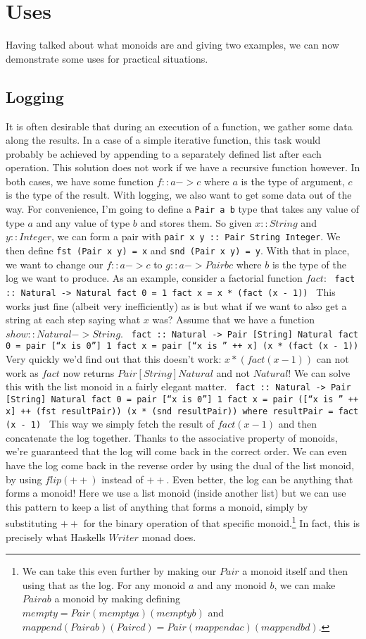 \documentclass{acm_proc_article-sp}
\begin{document}
\section{Uses}
Having talked about what monoids are and giving two examples, we can now
demonstrate some uses for practical situations.

\subsection{Logging}
It is often desirable that during an execution of a function, we
gather some data along the results. In a case of a simple iterative
function, this task would probably be achieved by appending to a
separately defined list after each operation. This solution does not
work if we have a recursive function however.
In both cases, we have some function $f :: a -> c$ where $a$ is
the type of argument, $c$ is the type of the result. With logging, we
also want to get some data out of the way. For convenience, I'm going
to define a \texttt{Pair a b} type that takes any value of type $a$ and any
value of type $b$ and stores them. So given $x :: String$ and $y ::
Integer$, we can form a pair with \texttt{pair x y :: Pair String
Integer}. We then define \texttt{fst (Pair x y) = x} and \texttt{snd (Pair x y) =
y}. With that in place, we want to change our $f :: a -> c$ to $g :: a
-> Pair b c$ where $b$ is the type of the log we want to
produce. As an example, consider a factorial function $fact$:
\texttt{
fact :: Natural -> Natural
fact 0 = 1
fact x = x * (fact (x - 1))
}
This works just fine (albeit very inefficiently) as is but what if we
want to also get a string at each step saying what $x$ was? Assume
that we have a function $show :: Natural -> String$.
\texttt{
fact :: Natural -> Pair [String] Natural
fact 0 = pair [``x is 0''] 1
fact x = pair [``x is '' ++ x] (x * (fact (x - 1))
}
Very quickly we'd find out that this doesn't work: $x * (fact (x -
1))$ can not work as $fact$ now returns $Pair [String] Natural$ and
not $Natural$! We can solve this with the list monoid in a fairly
elegant matter.
\texttt{
fact :: Natural -> Pair [String] Natural
fact 0 = pair [``x is 0''] 1
fact x = pair ([``x is '' ++ x] ++ (fst resultPair)) (x * (snd
resultPair))
  where resultPair = fact (x - 1)
}
This way we simply fetch the result of $fact (x - 1)$ and then
concatenate the log together. Thanks to the associative property of
monoids, we're guaranteed that the log will come back in the correct
order. We can even have the log come back in the reverse order by
using the dual of the list monoid, by using $flip (++)$ instead of
$++$. Even better, the log can be anything that forms a monoid! Here
we use a list monoid (inside another list) but we can use this pattern
to keep a list of anything that forms a monoid, simply by
substituting $++$ for the binary operation of that specific
monoid.\footnote{We can take this even further by making our $Pair$ a
  monoid itself and then using that as the log. For any monoid $a$ and
any monoid $b$, we can make $Pair a b$ a monoid by making defining
$mempty = Pair (mempty a) (mempty b)$ and $mappend (Pair a b) (Pair c
d) = Pair (mappend a c) (mappend b d)$.} In
fact, this is precisely what Haskells $Writer$ monad does.
\end{document}

